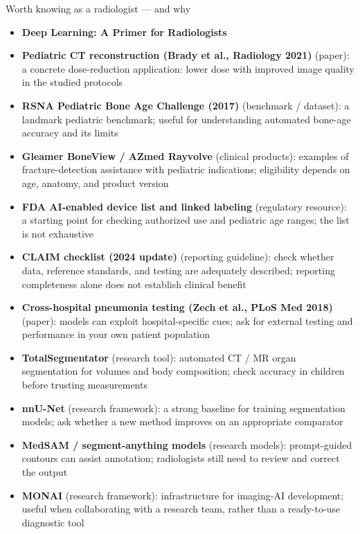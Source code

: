 \documentclass[aspectratio=169]{beamer}
\begin{document}
\begin{frame}{Worth knowing as a radiologist --- and why}
\scriptsize
\begin{itemize}
\item \textbf{Deep Learning: A Primer for Radiologists}
\item \textbf{Pediatric CT reconstruction (Brady et al., Radiology 2021)} (paper): a concrete dose-reduction application: lower dose with improved image quality in the studied protocols
\item \textbf{RSNA Pediatric Bone Age Challenge (2017)} (benchmark / dataset): a landmark pediatric benchmark; useful for understanding automated bone-age accuracy and its limits
\item \textbf{Gleamer BoneView / AZmed Rayvolve} (clinical products): examples of fracture-detection assistance with pediatric indications; eligibility depends on age, anatomy, and product version
\item \textbf{FDA AI-enabled device list and linked labeling} (regulatory resource): a starting point for checking authorized use and pediatric age ranges; the list is not exhaustive
\item \textbf{CLAIM checklist (2024 update)} (reporting guideline): check whether data, reference standards, and testing are adequately described; reporting completeness alone does not establish clinical benefit
\item \textbf{Cross-hospital pneumonia testing (Zech et al., PLoS Med 2018)} (paper): models can exploit hospital-specific cues; ask for external testing and performance in your own patient population
\item \textbf{TotalSegmentator} (research tool): automated CT / MR organ segmentation for volumes and body composition; check accuracy in children before trusting measurements
\item \textbf{nnU-Net} (research framework): a strong baseline for training segmentation models; ask whether a new method improves on an appropriate comparator
\item \textbf{MedSAM / segment-anything models} (research models): prompt-guided contours can assist annotation; radiologists still need to review and correct the output
\item \textbf{MONAI} (research framework): infrastructure for imaging-AI development; useful when collaborating with a research team, rather than a ready-to-use diagnostic tool
\end{itemize}
\end{frame}
\end{document}
